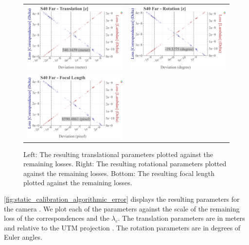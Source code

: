 \begin{figure}[t]
\begin{tabular}{cc}
    \includegraphics[width=0.45 \linewidth]{diagrams/calibration/s40_n_far/parameters.csv/Translation[z]_vs_Loss[Correspondences]_vs_Loss[Lambdas]_cluster_All.png} &
    \includegraphics[width=0.45 \linewidth]{diagrams/calibration/s40_n_far/parameters.csv/Rotation[z]_vs_Loss[Correspondences]_vs_Loss[Lambdas]_cluster_All.png} \\

    \includegraphics[width=0.45 \linewidth]{diagrams/calibration/s40_n_far/parameters.csv/FocalLength_vs_Loss[Correspondences]_vs_Loss[Lambdas]_cluster_All.png} \\
\end{tabular}
\caption{
  Left: The resulting translational parameters plotted against the remaining losses. 
  Right: The resulting rotational parameters plotted against the remaining losses.
  Bottom: The resulting focal length  plotted against the remaining losses.
  }
\label{fig:static_calibration_algorithmic_error}
\end{figure}

\autoref{fig:static_calibration_algorithmic_error} displays the resulting parameters for the camera .
We plot each of the parameters against the scale of the remaining loss of the correspondences and the $\lambda_c$.
The translation parameters are in meters and relative to the UTM projection \cite{langley1998utm}.
The rotation parameters are in degrees of Euler angles.

